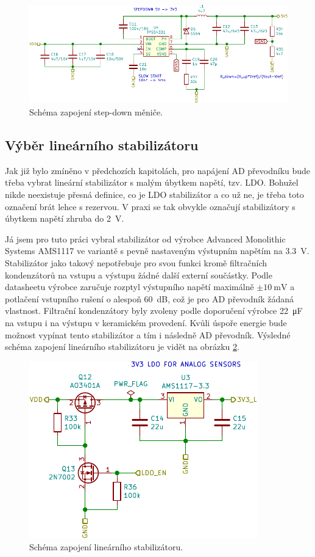\begin{figure}[h]
    \centering
    \includegraphics{obrazky/stepdown_schematic.pdf}
    \caption{Schéma zapojení step-down měniče.}
    \label{fig_StepDown-schematic}
\end{figure}

\subsection{Výběr lineárního stabilizátoru}

Jak již bylo zmíněno v předchozích kapitolách, pro napájení AD převodníku bude třeba vybrat lineární stabilizátor s malým úbytkem napětí, tzv. LDO. Bohužel nikde neexistuje přesná definice, co je LDO stabilizátor a co už ne, je třeba toto označení brát lehce s rezervou. V praxi se tak obvykle označují stabilizátory s úbytkem napětí zhruba do \SI{2}{\volt}.

Já jsem pro tuto práci vybral stabilizátor od výrobce Advanced Monolithic Systems AMS1117 \cite{dat_AMS1117} ve variantě s pevně nastaveným výstupním napětím na \SI{3,3}{\volt}. Stabilizátor jako takový nepotřebuje pro svou funkci kromě filtračních kondenzátorů na vstupu a výstupu žádné další externí součástky. Podle datasheetu výrobce zaručuje rozptyl výstupního napětí maximálně $\pm\SI{10}{\milli\volt}$ a potlačení vstupního rušení o alespoň \SI{60}{\deci\bel}, což je pro AD převodník žádaná vlastnost. Filtrační kondenzátory byly zvoleny podle doporučení výrobce \SI{22}{\micro\farad} na vstupu i na výstupu v keramickém provedení. Kvůli úspoře energie bude možnost vypínat tento stabilizátor a tím i následně AD převodník. Výsledné schéma zapojení lineárního stabilizátoru je vidět na obrázku \ref{fig_LDO-schematic}.

\begin{figure}[h]
    \centering
    \includegraphics{obrazky/ldo-schematic.pdf}
    \caption{Schéma zapojení lineárního stabilizátoru.}
    \label{fig_LDO-schematic}
\end{figure}


